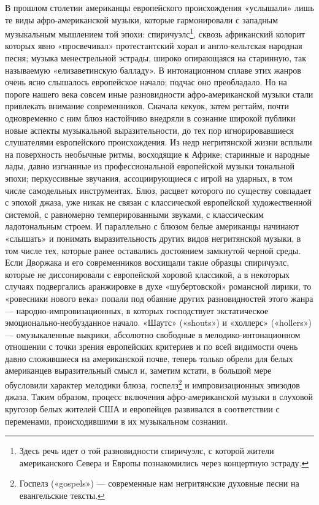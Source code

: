 В  прошлом столетии  американцы европейского  происхождения «услышали»
лишь  те  виды  афро-американской   музыки,  которые  гармонировали  с
западным  музыкальным мышлением  той эпохи:  спиричуэлс\footnote{Здесь
речь   идет  о   той  разновидности   спиричуэлс,  с   которой  жители
американского   Севера  и   Европы   познакомились  через   концертную
эстраду.},  сквозь  африканский  колорит  которых  явно  «просвечивал»
протестантский   хорал  и   англо-кельтская  народная   песня;  музыка
менестрельной эстрады, широко опирающаяся на старинную, так называемую
«елизаветинскую  балладу». В  интонационном сплаве  этих жанров  очень
ясно  слышалось  европейское начало;  подчас  оно  преобладало. Но  на
пороге  нашего   века  совсем  иные   разновидности  афро-американской
музыки  стали  привлекать   внимание  современников.  Сначала  кекуок,
затем регтайм,  почти одновременно  с ним  блюз настойчиво  внедряли в
сознание широкой публики новые аспекты музыкальной выразительности, до
тех  пор игнорировавшиеся  слушателями европейского  происхождения. Из
недр  негритянской  жизни  всплыли  на  поверхность  необычные  ритмы,
восходящие к  Африке; старинные  и народные  лады, давно  изгнанные из
профессиональной  европейской  музыки  тональной  эпохи;  перкуссивные
звучания, ассоциирующиеся с игрой на  ударных, в том числе самодельных
инструментах. Блюз,  расцвет которого  по существу совпадает  с эпохой
джаза, уже  никак не связан с  классической европейской художественной
системой,  с  равномерно   темперированными  звуками,  с  классическим
ладотональным строем. И параллельно с блюзом белые американцы начинают
«слышать» и понимать выразительность других видов негритянской музыки,
в  том  числе  тех,  которые  ранее  оставались  достоянием  замкнутой
черной  среды.  Если  Дворжака  и его  современников  восхищали  такие
образцы  спиричуэлс, которые  не диссонировали  с европейской  хоровой
классикой,  а  в некоторых  случаях  подвергались  аранжировке в  духе
«шубертовской» романсной лирики, то «ровесники нового века» попали под
обаяние других разновидностей  этого жанра — народно-импровизационных,
в которых господствует экстатическое эмоционально-необузданное начало.
«Шаутс» («shouts»)  и «холлерс»  («hollers») —  омузыкаленные выкрики,
абсолютно свободные в мелодико-интонационном  отношении с точки зрения
европейских  критериев и  по  всей видимости  очень давно  сложившиеся
на  американской почве,  теперь  только обрели  для белых  американцев
выразительный  смысл  и, заметим  кстати,  в  большой мере  обусловили
характер  мелодики   блюза,  госпелз\footnote{Госпелз   («gospels»)  —
современные нам негритянские духовные песни на евангельские тексты.} и
импровизационных  эпизодов  джаза.  Таким образом,  процесс  включения
афро-американской  музыки  в слуховой  кругозор  белых  жителей США  и
европейцев развивался в соответствии с переменами, происходившими в их
музыкальном сознании.

